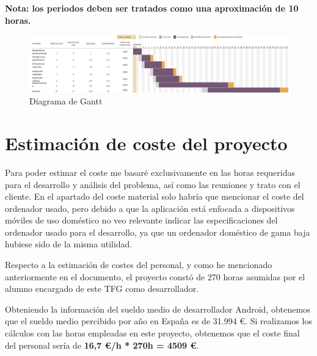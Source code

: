 \textbf{Nota: los periodos deben ser tratados como una aproximación de 10 horas.}

\bigskip

\begin{figure}[H]
    \centering
    \includegraphics[width=1\linewidth]{fig/gantt.png}
    \caption{Diagrama de Gantt}
    \label{fig:gantt}
\end{figure}

\section{Estimación de coste del proyecto}

Para poder estimar el coste me basaré exclusivamente en las horas requeridas para el desarrollo y análisis del problema, así como las reuniones y trato con el cliente. En el apartado del coste material solo habría que mencionar el coste del ordenador usado, pero debido a que la aplicación está enfocada a dispositivos móviles de uso doméstico no veo relevante indicar las especificaciones del ordenador usado para el desarrollo, ya que un ordenador doméstico de gama baja hubiese sido de la misma utilidad.

Respecto a la estimación de costes del personal, y como he mencionado anteriormente en el documento, el proyecto constó de 270 horas asumidas por el alumno encargado de este TFG como desarrollador.

Obteniendo la información del sueldo medio de desarrollador Android, obtenemos que el sueldo medio percibido por año en España es de 31.994 €. Si realizamos los cálculos con las horas empleadas en este proyecto, obtenemos que el coste final del personal sería de \textbf{16,7 €/h * 270h = 4509 €}.

\newpage

\newpage